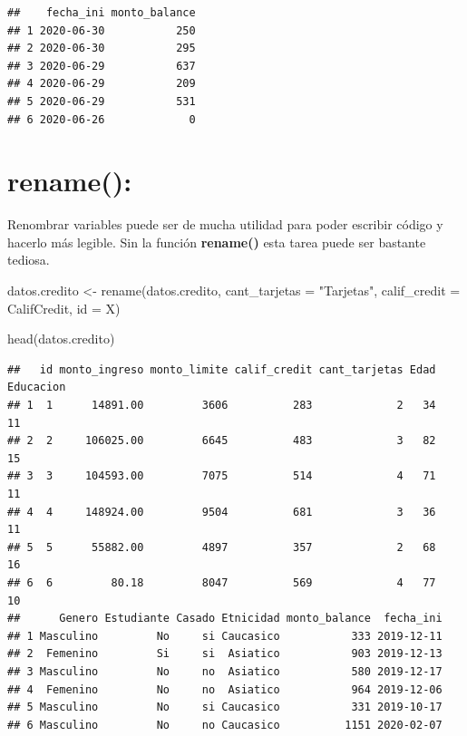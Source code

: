 \documentclass[
  12pt,
]{book}
\newenvironment{Shaded}{\begin{snugshade}}{\end{snugshade}}
\newcommand{\AttributeTok}[1]{\textcolor[rgb]{0.77,0.63,0.00}{#1}}
\newcommand{\FunctionTok}[1]{\textcolor[rgb]{0.00,0.00,0.00}{#1}}
\newcommand{\NormalTok}[1]{#1}
\newcommand{\OtherTok}[1]{\textcolor[rgb]{0.56,0.35,0.01}{#1}}
\newcommand{\StringTok}[1]{\textcolor[rgb]{0.31,0.60,0.02}{#1}}
\begin{document}
\begin{verbatim}
##    fecha_ini monto_balance
## 1 2020-06-30           250
## 2 2020-06-30           295
## 3 2020-06-29           637
## 4 2020-06-29           209
## 5 2020-06-29           531
## 6 2020-06-26             0
\end{verbatim}

\hypertarget{rename}{%
\section{\texorpdfstring{\textbf{rename()}:}{rename():}}\label{rename}}

Renombrar variables puede ser de mucha utilidad para poder escribir código y hacerlo más legible. Sin la función \textbf{rename()} esta tarea puede ser bastante tediosa.

\begin{Shaded}
\begin{Highlighting}[]
\NormalTok{datos.credito }\OtherTok{\textless{}{-}} \FunctionTok{rename}\NormalTok{(datos.credito, }\AttributeTok{cant\_tarjetas =} \StringTok{"Tarjetas"}\NormalTok{, }\AttributeTok{calif\_credit =}\NormalTok{ CalifCredit, }\AttributeTok{id =}\NormalTok{ X)}

\FunctionTok{head}\NormalTok{(datos.credito)}
\end{Highlighting}
\end{Shaded}

\begin{verbatim}
##   id monto_ingreso monto_limite calif_credit cant_tarjetas Edad Educacion
## 1  1      14891.00         3606          283             2   34        11
## 2  2     106025.00         6645          483             3   82        15
## 3  3     104593.00         7075          514             4   71        11
## 4  4     148924.00         9504          681             3   36        11
## 5  5      55882.00         4897          357             2   68        16
## 6  6         80.18         8047          569             4   77        10
##      Genero Estudiante Casado Etnicidad monto_balance  fecha_ini
## 1 Masculino         No     si Caucasico           333 2019-12-11
## 2  Femenino         Si     si  Asiatico           903 2019-12-13
## 3 Masculino         No     no  Asiatico           580 2019-12-17
## 4  Femenino         No     no  Asiatico           964 2019-12-06
## 5 Masculino         No     si Caucasico           331 2019-10-17
## 6 Masculino         No     no Caucasico          1151 2020-02-07
\end{verbatim}
\end{document}
